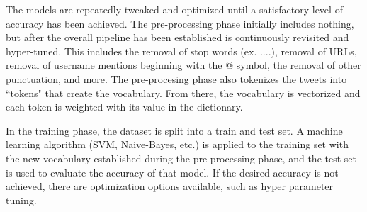 The models are repeatedly tweaked and optimized until a satisfactory level of accuracy has been achieved. The pre-processing phase initially includes nothing, but after the overall pipeline has been established is continuously revisited and hyper-tuned. This includes the removal of stop words (ex. ....), removal of URLs, removal of username mentions beginning with the @ symbol, the removal of other punctuation, and more. The pre-procesing phase also tokenizes the tweets into ``tokens" that create the vocabulary. From there, the vocabulary is vectorized and each token is weighted with its value in the dictionary.

In the training phase, the dataset is split into a train and test set. A machine learning algorithm (SVM, Naive-Bayes, etc.) is applied to the training set with the new vocabulary established during the pre-processing phase, and the test set is used to evaluate the accuracy of that model. If the desired accuracy is not achieved, there are optimization options available, such as hyper parameter tuning. 
